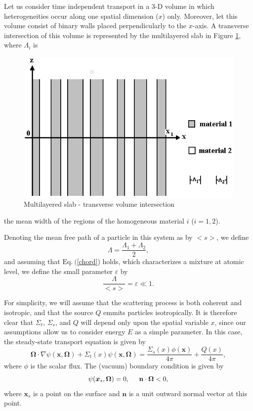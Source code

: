 \documentclass[12pt]{article}
\newcommand{\ep}{\varepsilon}
\newcommand{\bl}{\big<}
\newcommand{\bg}{\big>}
\newcommand{\n}{ \noindent}
\begin{document}
Let us consider time independent transport in a 3-D volume in which heterogeneities occur along one spatial dimension ($x$) only.
Moreover, let this volume consist of binary walls placed perpendicularly to the $x$-axis.
A transverse intersection of this volume is represented by the multilayered slab in Figure \ref{fig_multilayered}, where $\Lambda_i$ is
\begin{figure}[h]
\centering
\includegraphics[height=6 cm,width= 9 cm]{multilayered}
\caption{\footnotesize{Multilayered slab - transverse volume intersection}}\label{fig_multilayered}
\end{figure}
the mean width of the regions of the homogeneous material $i$ ($i=1,2$).

Denoting the mean free path of a particle in this system as by $\bl s\bg$, we define
\begin{equation}
\Lambda = \frac{\Lambda_1+\Lambda_2}{2},
\end{equation}
and assuming that $\textrm{Eq.}\ ($\ref{chord}) holds, which characterizes a mixture at atomic level, we define the small parameter $\ep$ by 
\begin{equation}\label{defatmix}
\frac{\Lambda}{\bl s\bg} = \ep \ll 1.
\end{equation}

For simplicity, we will assume that the scattering process is both coherent and isotropic, and that the source $Q$ emmits particles isotropically.
It is therefore clear that $\Sigma_t$, $\Sigma_s$, and $Q$ will depend only upon the spatial variable $x$, since our assumptions allow us to consider energy $E$ as a simple parameter. 
In this case, the steady-state transport equation is given by
\begin{equation}\label{onedimtimeind}
\bm\Omega\cdot\nabla\psi(\bm x,\bm\Omega) + \Sigma_t(x)\psi(\bm x,\bm\Omega) =
\frac{\Sigma_s(x)\phi(\bm x)}{4\pi}+\frac{Q(x)}{4\pi}
,%
\end{equation}
\n where $\phi$ is the scalar flux.
The (vacuum) boundary condition is given by
\begin{equation}
\psi(\bm x_s,\bm\Omega) = 0, \hspace{0.5 cm} \mathbf{n} \cdot \bm\Omega <0,
\end{equation}
where $\bm x_s$ is a point on the surface and $\mathbf{n}$ is a unit outward normal vector at this point.
\end{document}
